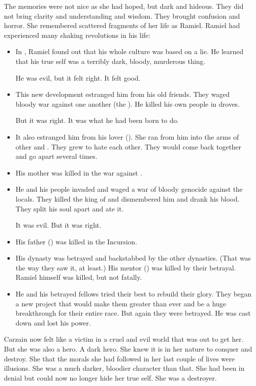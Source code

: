 The memories were not nice as she had hoped, but dark and hideous. 
They did not bring clarity and understanding and wisdom.
They brought confusion and horror. 
She remembered scattered fragments of her life as Ramiel.
Ramiel had experienced many shaking revolutions in his life:
\begin{itemize}
  \item 
    In \Merkyrah, Ramiel found out that his whole culture was based on a lie.
    He learned that his true self was a terribly dark, bloody, murderous thing.
    
    He was evil, but it felt right.
    It felt good.
  \item 
    This new development estranged him from his old friends.
    They waged bloody war against one another (the ). 
    He killed his own people in droves. 
    
    But it was right.
    It was what he had been born to do. 
  \item 
    It also estranged him from his lover (). 
    She ran from him into the arms of other \resphain and \resviel. 
    They grew to hate each other.
    They would come back together and go apart several times. 
  \item 
    His mother was killed in the war against \Merkyrah.
  \item 
    He and his people invaded \Tembrae and waged a war of bloody genocide against the locals.
    They killed the king of \Tembrae and dismembered him and drank his blood.
    They split his soul apart and ate it.
    
    It was evil. 
    But it was right.
  \item 
    His father (\Nathrach) was killed in the Incursion. 
  \item 
    His dynasty was betrayed and backstabbed by the other dynasties. 
    (That was the way they saw it, at least.)
    His mentor (\Zachirah) was killed by their betrayal.
    Ramiel himself was killed, but not fatally. 
  \item 
    He and his betrayed fellows tried their best to rebuild their glory.
    They began a new project that would make them greater than ever and be a huge breakthrough for their entire race.
    But again they were betrayed.
    He was cast down and lost his power. 
\end{itemize}

Carzain now felt like a victim in a cruel and evil world that was out to get her. 
But she was also a hero. 
A dark hero. 
She knew it is in her nature to conquer and destroy.
She  that the morals she had followed in her last couple of lives were illusions.
She was a much darker, bloodier character than that. 
She had been in denial but could now no longer hide her true self. 
She was a destroyer. 

